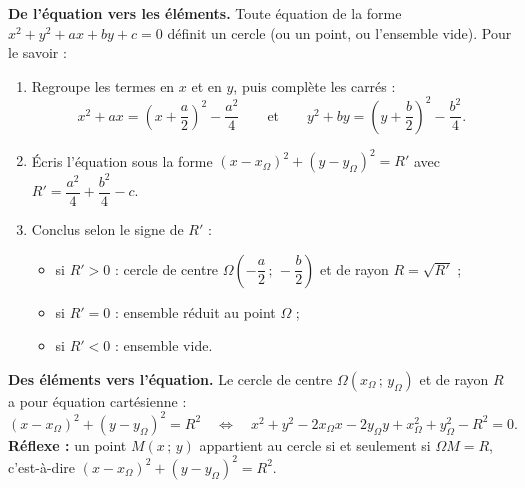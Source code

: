 \documentclass[11pt]{article}
\begin{document}
\begin{methode}
\textbf{De l'équation vers les éléments.} Toute équation de la forme $x^2+y^2+ax+by+c=0$ définit un cercle (ou un point, ou l'ensemble vide). Pour le savoir :
\begin{enumerate}
\item Regroupe les termes en $x$ et en $y$, puis complète les carrés :
\[x^2+ax=\left(x+\frac{a}{2}\right)^2-\frac{a^2}{4} \qquad\text{et}\qquad y^2+by=\left(y+\frac{b}{2}\right)^2-\frac{b^2}{4}.\]
\item Écris l'équation sous la forme $(x-x_\Omega)^2+(y-y_\Omega)^2=R'$ avec $R'=\dfrac{a^2}{4}+\dfrac{b^2}{4}-c$.
\item Conclus selon le signe de $R'$ :
\begin{itemize}
\item si $R'>0$ : cercle de centre $\Omega\left(-\dfrac{a}{2}\,;\,-\dfrac{b}{2}\right)$ et de rayon $R=\sqrt{R'}$ ;
\item si $R'=0$ : ensemble réduit au point $\Omega$ ;
\item si $R'<0$ : ensemble vide.
\end{itemize}
\end{enumerate}
\textbf{Des éléments vers l'équation.} Le cercle de centre $\Omega(x_\Omega\,;\,y_\Omega)$ et de rayon $R$ a pour équation cartésienne :
\[(x-x_\Omega)^2+(y-y_\Omega)^2=R^2 \quad\iff\quad x^2+y^2-2x_\Omega x-2y_\Omega y+x_\Omega^2+y_\Omega^2-R^2=0.\]
\textbf{Réflexe :} un point $M(x\,;\,y)$ appartient au cercle si et seulement si $\Omega M=R$, c'est-à-dire $(x-x_\Omega)^2+(y-y_\Omega)^2=R^2$.
\end{methode}
\end{document}
